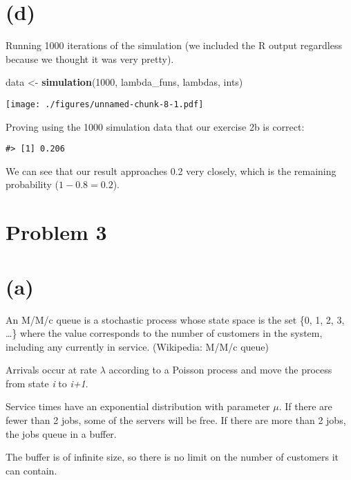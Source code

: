 \documentclass[]{article}
\newenvironment{Shaded}{\begin{snugshade}}{\end{snugshade}}
\newcommand{\DecValTok}[1]{\textcolor[rgb]{0.00,0.00,0.81}{#1}}
\newcommand{\KeywordTok}[1]{\textcolor[rgb]{0.13,0.29,0.53}{\textbf{#1}}}
\newcommand{\NormalTok}[1]{#1}
\newcommand{\StringTok}[1]{\textcolor[rgb]{0.31,0.60,0.02}{#1}}
\begin{document}
\newpage

\hypertarget{d}{%
\section{(d)}\label{d}}

Running 1000 iterations of the simulation (we included the R output
regardless because we thought it was very pretty).

\begin{Shaded}
\begin{Highlighting}[]
\NormalTok{data <-}\StringTok{ }\KeywordTok{simulation}\NormalTok{(}\DecValTok{1000}\NormalTok{, lambda_funs, lambdas, ints)}
\end{Highlighting}
\end{Shaded}

\texttt{[image: ./figures/unnamed-chunk-8-1.pdf]}

Proving using the 1000 simulation data that our exercise 2b is correct:

\begin{verbatim}
#> [1] 0.206
\end{verbatim}

We can see that our result approaches 0.2 very closely, which is the
remaining probability (\(1-0.8 = 0.2\)).

\hypertarget{problem-3}{%
\section{Problem 3}\label{problem-3}}

\hypertarget{a-1}{%
\section{(a)}\label{a-1}}

An M/M/c queue is a stochastic process whose state space is the set \{0,
1, 2, 3, \ldots{}\} where the value corresponds to the number of
customers in the system, including any currently in service. (Wikipedia:
M/M/c queue)

Arrivals occur at rate \(\lambda\) according to a Poisson process and
move the process from state \emph{i} to \emph{i+1}.

Service times have an exponential distribution with parameter \(\mu\).
If there are fewer than 2 jobs, some of the servers will be free. If
there are more than 2 jobs, the jobs queue in a buffer.

The buffer is of infinite size, so there is no limit on the number of
customers it can contain.
\end{document}
